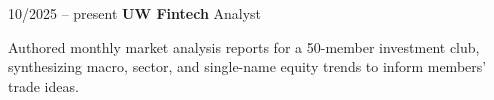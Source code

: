 \begin{twocolentry}{10/2025 – present} \textbf{UW Fintech} 
    \newline Analyst \end{twocolentry}
\begin{onecolentry}
\begin{highlights}
\item Authored monthly market analysis reports for a 50-member investment club, synthesizing macro, sector, and single-name equity trends to inform members' trade ideas.
\end{highlights}
\end{onecolentry}